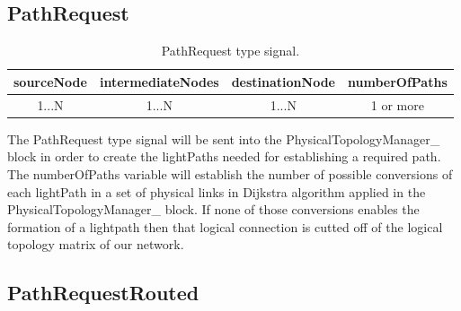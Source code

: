 \subsection{PathRequest}

\begin{table}[H]
	\centering
	\begin{tabular}{|c|c|c|c|}
		\hline
		sourceNode & intermediateNodes & destinationNode & numberOfPaths \\ \hline
		1...N      & 1...N             & 1...N           & 1 or more     \\ \hline
	\end{tabular}
	\caption{PathRequest type signal.}
	\label{PathRequest}
\end{table}

The PathRequest type signal will be sent into the PhysicalTopologyManager\_  block in order to create the lightPaths needed for establishing a required path. The numberOfPaths variable will establish the number of possible conversions of each lightPath in a set of physical links in Dijkstra algorithm applied in the PhysicalTopologyManager\_  block. If none of those conversions enables the formation of a lightpath then that logical connection is cutted off of the logical topology matrix of our network.



\subsection{PathRequestRouted}


